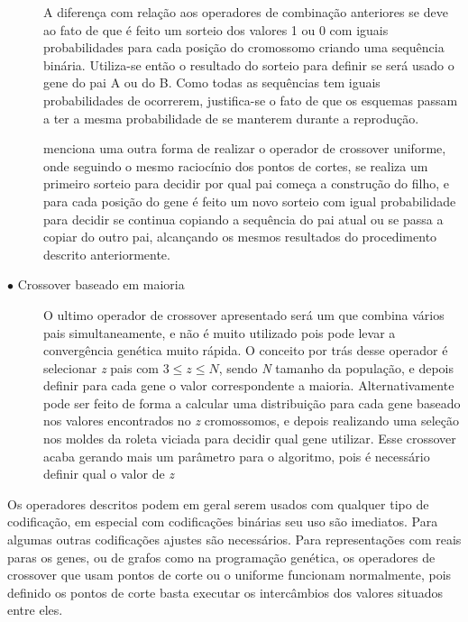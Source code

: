 \begin{description}
A diferença com relação aos operadores de combinação anteriores se deve ao fato de que é feito um sorteio dos valores 1 ou 0 com iguais probabilidades para cada posição do cromossomo criando uma sequência binária. Utiliza-se então o resultado do sorteio para definir se será usado o gene do pai A ou do B. Como todas as sequências tem iguais probabilidades de ocorrerem, justifica-se o fato de que os esquemas passam a ter a mesma probabilidade de se manterem durante a reprodução.

\citeauthor{Mitchell1996} menciona uma outra forma de realizar o operador de crossover uniforme, onde seguindo o mesmo raciocínio dos pontos de cortes, se realiza um primeiro sorteio para decidir por qual pai começa a construção do filho, e para cada posição do gene é feito um novo sorteio com igual probabilidade para decidir se continua copiando a sequência do pai atual ou se passa a copiar do outro pai, alcançando os mesmos resultados do procedimento descrito anteriormente.

\item[$\bullet$ Crossover baseado em maioria] \text{}

O ultimo operador de crossover apresentado será um que combina vários pais simultaneamente, e não é muito utilizado pois pode levar a convergência genética muito rápida. O conceito por trás desse operador é selecionar \textit{z} pais com \(3 \le z \le N\), sendo \textit{N} tamanho da população, e depois definir para cada gene o valor correspondente a maioria. Alternativamente pode ser feito de forma a calcular uma distribuição para cada gene baseado nos valores encontrados no \textit{z} cromossomos, e depois realizando uma seleção nos moldes da roleta viciada para decidir qual gene utilizar. Esse crossover acaba gerando mais um parâmetro para o algoritmo, pois é necessário definir qual o valor de \textit{z}
 
\end{description}

Os operadores descritos podem em geral serem usados com qualquer tipo de codificação, em especial com codificações binárias seu uso são imediatos. Para algumas outras codificações ajustes são necessários. Para representações com reais paras os genes, ou de grafos como na programação genética, os operadores de crossover que usam pontos de corte ou o uniforme funcionam normalmente, pois definido os pontos de corte basta executar os intercâmbios dos valores situados entre eles. 

